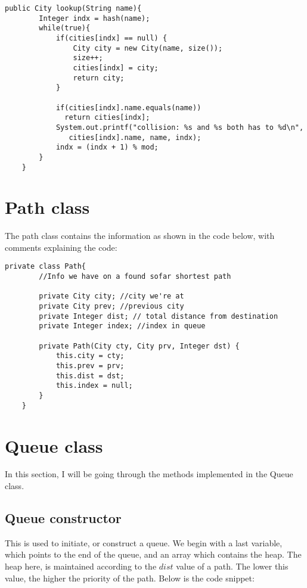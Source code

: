 \documentclass[a4paper,11pt]{article}
\begin{document}
\begin{verbatim}
public City lookup(String name){
        Integer indx = hash(name);
        while(true){
            if(cities[indx] == null) {
                City city = new City(name, size());
                size++;
                cities[indx] = city;
                return city;
            }

            if(cities[indx].name.equals(name))
              return cities[indx];
            System.out.printf("collision: %s and %s both has to %d\n", 
               cities[indx].name, name, indx);
            indx = (indx + 1) % mod;
        }
    }
\end{verbatim}


\section*{Path class}
The path class contains the information as shown in the code below, with comments explaining the code:

\begin{verbatim}
private class Path{
        //Info we have on a found sofar shortest path

        private City city; //city we're at
        private City prev; //previous city
        private Integer dist; // total distance from destination
        private Integer index; //index in queue

        private Path(City cty, City prv, Integer dst) {
            this.city = cty;
            this.prev = prv;
            this.dist = dst;
            this.index = null;
        }
    }
\end{verbatim}


\section*{Queue class}
In this section, I will be going through the methods implemented in the Queue class.

\subsection*{ Queue constructor}
This is used to initiate, or construct a queue. We begin with a last variable, which points to the end of the queue, and an array which contains the heap. The heap here, is maintained according to the $dist$ value of a path. The lower this value, the higher the priority of the path. Below is the code snippet:
\end{document}
